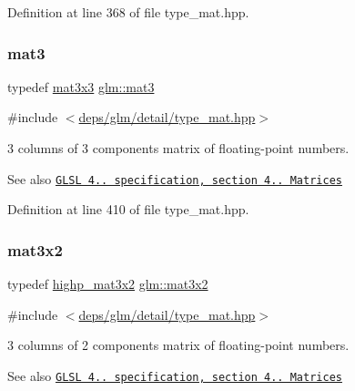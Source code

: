 Definition at line 368 of file type\+\_\+mat.\+hpp.

\mbox{\label{group__core__types_gadfaff2a7dce5cbf4e77a47ecea42ac5b}} 
\subsubsection{\texorpdfstring{mat3}{mat3}}
{\footnotesize\ttfamily typedef \hyperlink{group__core__types_ga6fecca6a869070b6bf8acb44ce1c2af3}{mat3x3} \hyperlink{group__core__types_gadfaff2a7dce5cbf4e77a47ecea42ac5b}{glm\+::mat3}}



{\ttfamily \#include $<$\hyperlink{type__mat_8hpp}{deps/glm/detail/type\+\_\+mat.\+hpp}$>$}

3 columns of 3 components matrix of floating-\/point numbers.

\begin{DoxySeeAlso}{See also}
\href{http://www.opengl.org/registry/doc/GLSLangSpec.4.20.8.pdf}{\tt G\+L\+SL 4.. specification, section 4.. Matrices} 
\end{DoxySeeAlso}


Definition at line 410 of file type\+\_\+mat.\+hpp.

\mbox{\label{group__core__types_gad7476e0e866186f12ee87975c6b01552}} 
\subsubsection{\texorpdfstring{mat3x2}{mat3x2}}
{\footnotesize\ttfamily typedef \hyperlink{group__core__precision_ga2188c0b772ac9d6210d46af34e04f375}{highp\+\_\+mat3x2} \hyperlink{group__core__types_gad7476e0e866186f12ee87975c6b01552}{glm\+::mat3x2}}



{\ttfamily \#include $<$\hyperlink{type__mat_8hpp}{deps/glm/detail/type\+\_\+mat.\+hpp}$>$}

3 columns of 2 components matrix of floating-\/point numbers.

\begin{DoxySeeAlso}{See also}
\href{http://www.opengl.org/registry/doc/GLSLangSpec.4.20.8.pdf}{\tt G\+L\+SL 4.. specification, section 4.. Matrices} 
\end{DoxySeeAlso}


